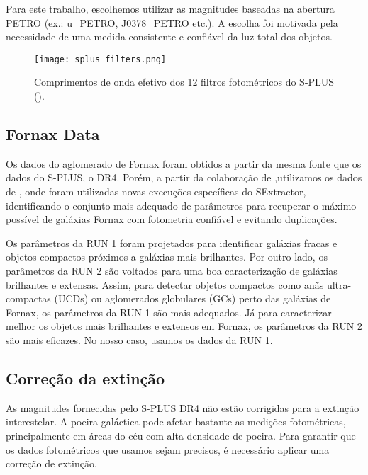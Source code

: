 Para este trabalho, escolhemos utilizar as magnitudes baseadas na abertura PETRO (ex.: u\_PETRO, J0378\_PETRO etc.). A escolha foi motivada pela necessidade de uma medida consistente e confiável da luz total dos objetos.

\begin{figure}[!ht]
    \begin{center}
    \texttt{[image: splus\_filters.png]}
    \caption[]{Comprimentos de onda efetivo dos 12 filtros fotométricos do S-PLUS (\cite{splus_DR4_footprint}).}
    \label{splus_filters}
    \end{center}
\end{figure}

\subsection{Fornax Data}
\label{sec:Fornax_data}
Os dados do aglomerado de Fornax foram obtidos a partir da mesma fonte que os dados do S-PLUS, o DR4. Porém, a partir da colaboração de \cite{castelli2024splusfornaxprojectsfp},utilizamos os dados de \cite{haack2024splusfornaxprojectsfp}, onde foram utilizadas novas execuções específicas do SExtractor, identificando o  conjunto mais adequado de parâmetros para recuperar o máximo possível de galáxias Fornax com fotometria confiável e evitando duplicações.

\vspace{\baselineskip}

Os parâmetros da RUN 1 foram projetados para identificar galáxias fracas e objetos compactos próximos a galáxias mais brilhantes. Por outro lado, os parâmetros da RUN 2 são voltados para uma boa caracterização de galáxias brilhantes e extensas. Assim, para detectar objetos compactos como anãs ultra-compactas (UCDs) ou aglomerados globulares (GCs) perto das galáxias de Fornax, os parâmetros da RUN 1 são mais adequados. Já para caracterizar melhor os objetos mais brilhantes e extensos em Fornax, os parâmetros da RUN 2 são mais eficazes. No nosso caso, usamos os dados da RUN 1.

\vspace{\baselineskip}

\subsection{Correção da extinção}
\label{sec:Coeficientes_ext}
As magnitudes fornecidas pelo S-PLUS DR4 não estão corrigidas para a extinção interestelar. A poeira galáctica pode afetar bastante as medições fotométricas, principalmente em áreas do céu com alta densidade de poeira. Para garantir que os dados fotométricos que usamos sejam precisos, é necessário aplicar uma correção de extinção.

